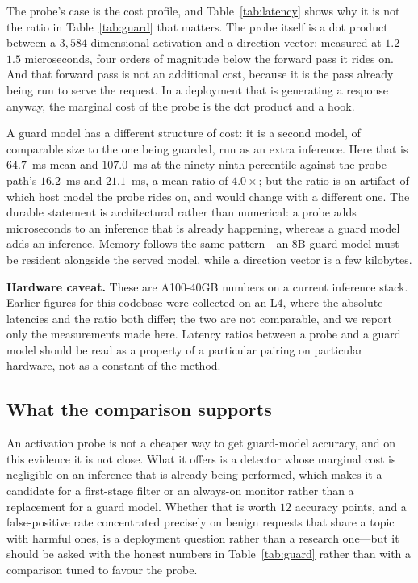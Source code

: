 

The probe's case is the cost profile, and Table~\ref{tab:latency} shows why it is not the ratio in
Table~\ref{tab:guard} that matters. The probe itself is a dot product between a $3{,}584$-dimensional activation and a
direction vector: measured at $1.2$--$1.5$ microseconds, four orders of magnitude below the forward pass it rides on.
And that forward pass is not an additional cost, because it is the pass already being run to serve the request. In a
deployment that is generating a response anyway, the marginal cost of the probe is the dot product and a hook.

A guard model has a different structure of cost: it is a second model, of comparable size to the one being guarded,
run as an extra inference. Here that is $64.7$~ms mean and $107.0$~ms at the ninety-ninth percentile against the
probe path's $16.2$~ms and $21.1$~ms, a mean ratio of $4.0\times$; but the ratio is an artifact of which host model
the probe rides on, and would change with a different one. The durable statement is architectural rather than
numerical: a probe adds microseconds to an inference that is already happening, whereas a guard model adds an
inference. Memory follows the same pattern---an $8$B guard model must be resident alongside the served model, while a
direction vector is a few kilobytes.

\textbf{Hardware caveat.} These are A100-40GB numbers on a current inference stack. Earlier figures for this codebase
were collected on an L4, where the absolute latencies and the ratio both differ; the two are not comparable, and we
report only the measurements made here. Latency ratios between a probe and a guard model should be read as a property
of a particular pairing on particular hardware, not as a constant of the method.

\subsection{What the comparison supports}
\label{sec:guard_claims}

An activation probe is not a cheaper way to get guard-model accuracy, and on this evidence it is not close. What it
offers is a detector whose marginal cost is negligible on an inference that is already being performed, which makes
it a candidate for a first-stage filter or an always-on monitor rather than a replacement for a guard model. Whether
that is worth $12$ accuracy points, and a false-positive rate concentrated precisely on benign requests that share a
topic with harmful ones, is a deployment question rather than a research one---but it should be asked with the honest
numbers in Table~\ref{tab:guard} rather than with a comparison tuned to favour the probe.
